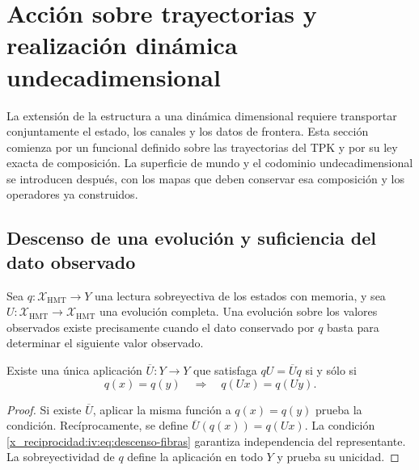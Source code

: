 \section{Acción sobre trayectorias y realización dinámica undecadimensional}
\label{x_reciprocidad:iv:accion-realizacion}

La extensión de la estructura a una dinámica dimensional requiere
transportar conjuntamente el estado, los canales y los datos de
frontera. Esta sección comienza por un funcional definido sobre
las trayectorias del TPK y por su ley exacta de composición.
La superficie de mundo y el codominio undecadimensional se
introducen después, con los mapas que deben conservar esa
composición y los operadores ya construidos.

\subsection{Descenso de una evolución y suficiencia del dato observado}

Sea \(q:\mathcal X_{\mathrm{HMT}}\to Y\) una lectura
sobreyectiva de los estados con memoria, y sea
\(U:\mathcal X_{\mathrm{HMT}}\to\mathcal X_{\mathrm{HMT}}\)
una evolución completa. Una evolución sobre los valores
observados existe precisamente cuando el dato conservado por
\(q\) basta para determinar el siguiente valor observado.

\begin{theorem}
\label{x_reciprocidad:iv:thm:descenso-fibras}
Existe una única aplicación \(\overline U:Y\to Y\)
que satisfaga \(qU=\overline Uq\) si y sólo si
\begin{equation}
 q(x)=q(y)\quad\Longrightarrow\quad q(Ux)=q(Uy).
 \label{x_reciprocidad:iv:eq:descenso-fibras}
\end{equation}
\end{theorem}
\begin{proof}
Si existe \(\overline U\), aplicar la misma función a
\(q(x)=q(y)\) prueba la condición. Recíprocamente, se
define \(\overline U(q(x))=q(Ux)\). La condición
\eqref{x_reciprocidad:iv:eq:descenso-fibras} garantiza independencia del
representante. La sobreyectividad de \(q\) define la
aplicación en todo \(Y\) y prueba su unicidad.
\end{proof}

